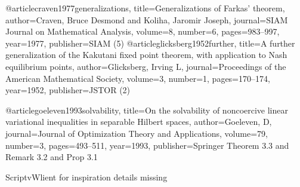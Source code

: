 @article{craven1977generalizations,
  title={Generalizations of Farkas’ theorem},
  author={Craven, Bruce Desmond and Koliha, Jaromir Joseph},
  journal={SIAM Journal on Mathematical Analysis},
  volume={8},
  number={6},
  pages={983--997},
  year={1977},
  publisher={SIAM}
}
(5)
@article{glicksberg1952further,
  title={A further generalization of the Kakutani fixed point theorem, with application to Nash equilibrium points},
  author={Glicksberg, Irving L},
  journal={Proceedings of the American Mathematical Society},
  volume={3},
  number={1},
  pages={170--174},
  year={1952},
  publisher={JSTOR}
}
(2)


@article{goeleven1993solvability,
  title={On the solvability of noncoercive linear variational inequalities in separable Hilbert spaces},
  author={Goeleven, D},
  journal={Journal of Optimization Theory and Applications},
  volume={79},
  number={3},
  pages={493--511},
  year={1993},
  publisher={Springer}
}
Theorem 3.3 and Remark 3.2 and Prop 3.1

ScriptvWlient for inspiration details missing
